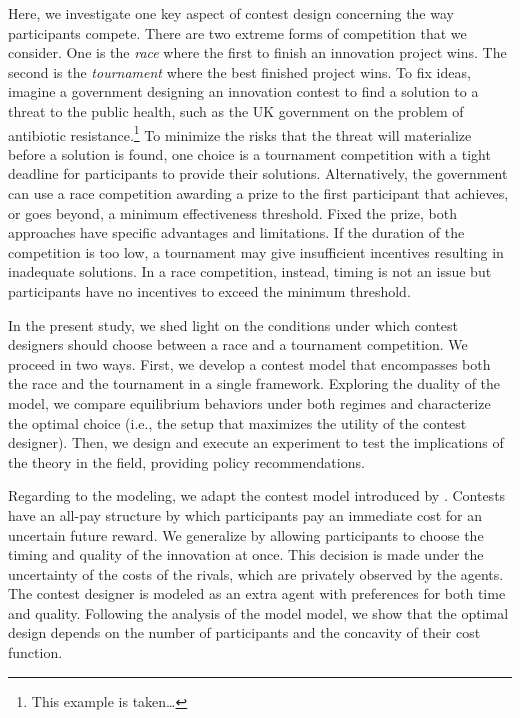 \documentclass[12pt,]{article}
\begin{document}
Here, we investigate one key aspect of contest design concerning the way
participants compete. There are two extreme forms of competition that we
consider. One is the \emph{race} where the first to finish an innovation
project wins. The second is the \emph{tournament} where the best
finished project wins. To fix ideas, imagine a government designing an
innovation contest to find a solution to a threat to the public health,
such as the UK government on the problem of antibiotic
resistance.\footnote{This example is taken\ldots{}} To minimize the
risks that the threat will materialize before a solution is found, one
choice is a tournament competition with a tight deadline for
participants to provide their solutions. Alternatively, the government
can use a race competition awarding a prize to the first participant
that achieves, or goes beyond, a minimum effectiveness threshold. Fixed
the prize, both approaches have specific advantages and limitations. If
the duration of the competition is too low, a tournament may give
insufficient incentives resulting in inadequate solutions. In a race
competition, instead, timing is not an issue but participants have no
incentives to exceed the minimum threshold.

In the present study, we shed light on the conditions under which
contest designers should choose between a race and a tournament
competition. We proceed in two ways. First, we develop a contest model
that encompasses both the race and the tournament in a single framework.
Exploring the duality of the model, we compare equilibrium behaviors
under both regimes and characterize the optimal choice (i.e., the setup
that maximizes the utility of the contest designer). Then, we design and
execute an experiment to test the implications of the theory in the
field, providing policy recommendations.

Regarding to the modeling, we adapt the contest model introduced by
\citet{moldovanu2001optimal}. Contests have an all-pay structure by
which participants pay an immediate cost for an uncertain future reward.
We generalize by allowing participants to choose the timing and quality
of the innovation at once. This decision is made under the uncertainty
of the costs of the rivals, which are privately observed by the agents.
The contest designer is modeled as an extra agent with preferences for
both time and quality. Following the analysis of the model model, we
show that the optimal design depends on the number of participants and
the concavity of their cost function.
\end{document}
